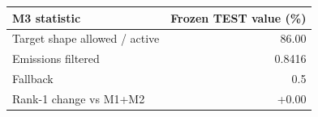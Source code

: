 \begin{table}[t]
\centering
\small
\begin{tabular}{lr}
\toprule
M3 statistic & Frozen TEST value (\%) \\
\midrule
Target shape allowed / active & 86.00 \\
Emissions filtered & 0.8416 \\
Fallback & 0.5 \\
Rank-1 change vs M1+M2 & +0.00 \\
\bottomrule
\end{tabular}
\end{table}
